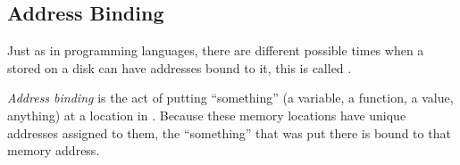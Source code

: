 \subsection{Address Binding}\label{subsec:Address_Binding}
Just as in programming languages, there are different possible times when a  stored on a disk can have  addresses bound to it, this is called .

\begin{definition}\label{def:Address_Binding}
  \emph{Address binding} is the act of putting ``something'' (a variable, a function, a value, anything) at a location in .
  Because these memory locations have unique addresses assigned to them, the ``something'' that was put there is bound to that memory address.
\end{definition}


